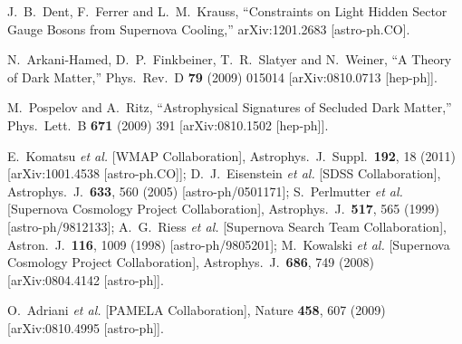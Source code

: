 J.~B.~Dent, F.~Ferrer and L.~M.~Krauss,
``Constraints on Light Hidden Sector Gauge Bosons from Supernova Cooling,''
arXiv:1201.2683 [astro-ph.CO].


N.~Arkani-Hamed, D.~P.~Finkbeiner, T.~R.~Slatyer and N.~Weiner,
``A Theory of Dark Matter,''
Phys.\ Rev.\ D {\bf 79} (2009) 015014
[arXiv:0810.0713 [hep-ph]].

M.~Pospelov and A.~Ritz,
``Astrophysical Signatures of Secluded Dark Matter,''
Phys.\ Lett.\ B {\bf 671} (2009) 391
[arXiv:0810.1502 [hep-ph]].


  E.~Komatsu {\it et al.}  [WMAP Collaboration],
  Astrophys.\ J.\ Suppl.\  {\bf 192}, 18 (2011)
  [arXiv:1001.4538 [astro-ph.CO]];
  D.~J.~Eisenstein {\it et al.}  [SDSS Collaboration],
  Astrophys.\ J.\  {\bf 633}, 560 (2005)
  [astro-ph/0501171];
  S.~Perlmutter {\it et al.}  [Supernova Cosmology Project Collaboration],
  Astrophys.\ J.\  {\bf 517}, 565 (1999)
  [astro-ph/9812133];
  A.~G.~Riess {\it et al.}  [Supernova Search Team Collaboration],
  Astron.\ J.\  {\bf 116}, 1009 (1998)
  [astro-ph/9805201];
  M.~Kowalski {\it et al.}  [Supernova Cosmology Project Collaboration],
  Astrophys.\ J.\  {\bf 686}, 749 (2008)
  [arXiv:0804.4142 [astro-ph]].

  O.~Adriani {\it et al.}  [PAMELA Collaboration],
  Nature {\bf 458}, 607 (2009)
  [arXiv:0810.4995 [astro-ph]].

